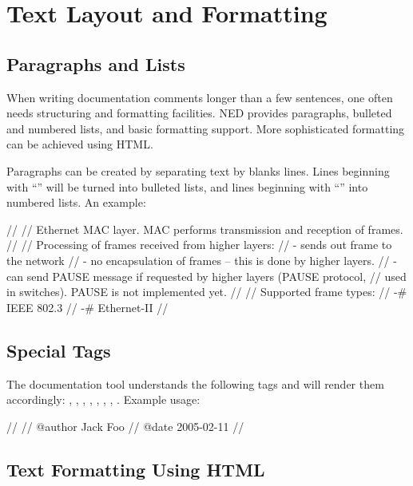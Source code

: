 \section{Text Layout and Formatting}
\label{sec:neddoc:text-layout-and-formatting}

\subsection{Paragraphs and Lists}
\label{sec:neddoc:paragraphs-and-lists}

When writing documentation comments longer than a few sentences, one often
needs structuring and formatting facilities. NED provides paragraphs,
bulleted and numbered lists, and basic formatting support. More
sophisticated formatting can be achieved using HTML.

Paragraphs can be created by separating text by blanks lines. Lines
beginning with ``\ttt{-}'' will be turned into bulleted lists, and lines
beginning with ``\ttt{-\#}'' into numbered lists. An example:

\begin{ned}
//
// Ethernet MAC layer. MAC performs transmission and reception of frames.
//
// Processing of frames received from higher layers:
// - sends out frame to the network
// - no encapsulation of frames -- this is done by higher layers.
// - can send PAUSE message if requested by higher layers (PAUSE protocol,
//   used in switches). PAUSE is not implemented yet.
//
// Supported frame types:
// -# IEEE 802.3
// -# Ethernet-II
//
\end{ned}


\subsection{Special Tags}
\label{sec:neddoc:special-tags}

The documentation tool understands the following tags and will render them accordingly:
, , , , , ,
, . Example usage:

\begin{ned}
//
// @author Jack Foo
// @date 2005-02-11
//
\end{ned}


\subsection{Text Formatting Using HTML}
\label{sec:neddoc:text-formatting-using-html}

